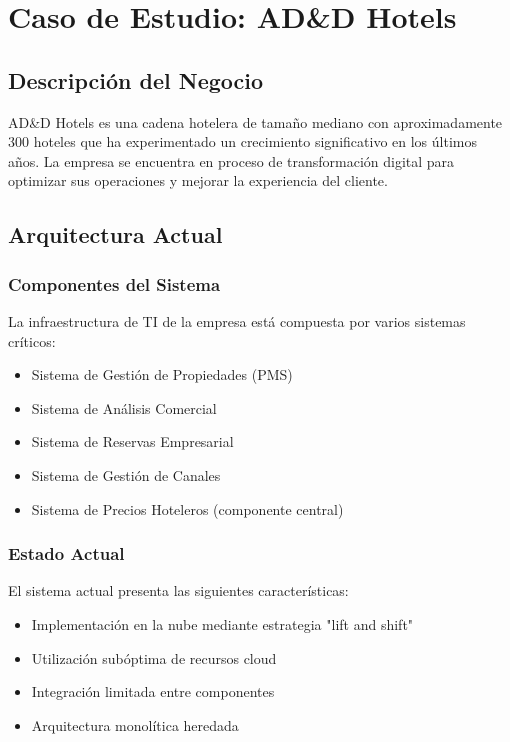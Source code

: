 
\chapter{Caso de Estudio: AD\&D Hotels}

\section{Descripción del Negocio}
AD\&D Hotels es una cadena hotelera de tamaño mediano con aproximadamente 300 hoteles que ha experimentado un crecimiento significativo en los últimos años. La empresa se encuentra en proceso de transformación digital para optimizar sus operaciones y mejorar la experiencia del cliente.

\section{Arquitectura Actual}
\subsection{Componentes del Sistema}
La infraestructura de TI de la empresa está compuesta por varios sistemas críticos:
\begin{itemize}
    \item Sistema de Gestión de Propiedades (PMS)
    \item Sistema de Análisis Comercial
    \item Sistema de Reservas Empresarial
    \item Sistema de Gestión de Canales
    \item Sistema de Precios Hoteleros (componente central)
\end{itemize}

\subsection{Estado Actual}
El sistema actual presenta las siguientes características:
\begin{itemize}
    \item Implementación en la nube mediante estrategia "lift and shift"
    \item Utilización subóptima de recursos cloud
    \item Integración limitada entre componentes
    \item Arquitectura monolítica heredada
\end{itemize}

